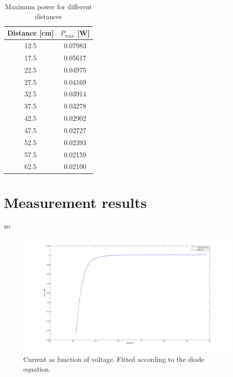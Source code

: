 \documentclass[12pt,a4paper]{article}
\begin{document}
\begin{table}
  \centering
  \begin{tabular}{|c|c|}
    \hline
    Distance [cm] & $P_{max}$ [W] \\
    \hline
    12.5 & 0.07983 \\
    17.5 & 0.05617 \\
    22.5 & 0.04975 \\
    27.5 & 0.04169 \\
    32.5 & 0.03914 \\
    37.5 & 0.03278 \\
    42.5 & 0.02902 \\
    47.5 & 0.02727 \\
    52.5 & 0.02393 \\
    57.5 & 0.02159 \\
    62.5 & 0.02100 \\
    \hline
  \end{tabular}
  \caption{Maximum power for different distances}
  \label{tab}
\end{table}

\newpage
\section{Measurement results}zo
\vfill
\begin{figure}[h!]
  \begin{center}
    \includegraphics[scale=0.07]{IvsUnoIlumination.png}
  \end{center}
  \caption{Current as function of voltage. Fitted according to the diode equation.}
  \label{ivsun}
\end{figure}
\end{document}
